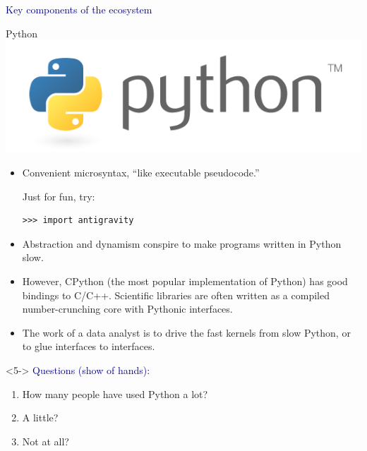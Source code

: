 \documentclass[aspectratio=169]{beamer}
\begin{document}
\begin{frame}{}
\begin{center}
\LARGE \textcolor{darkblue}{Key components of the ecosystem}
\end{center}
\end{frame}

\begin{frame}[fragile]{Python}
\vspace{0.5 cm}
\hfill \includegraphics[height=1 cm]{python-logo.png}

\vspace{-1 cm}
\begin{itemize}\setlength{\itemsep}{0.25 cm}
\item Convenient microsyntax, ``like executable pseudocode.''

Just for fun, try:

\small
\begin{verbatim}
>>> import antigravity
\end{verbatim}
\normalsize

\item<2-> Abstraction and dynamism conspire to make programs written in Python slow.

\item<3-> However, CPython (the most popular implementation of Python) has good bindings to C/C++. Scientific libraries are often written as a compiled number-crunching core with Pythonic interfaces.

\item<4-> The work of a data analyst is to drive the fast kernels from slow Python, or to glue interfaces to interfaces.
\end{itemize}

\vspace{0.25 cm}
\begin{uncoverenv}<5->
\small
\textcolor{darkblue}{Questions (show of hands):}
\vspace{-0.2 cm}
\begin{enumerate}\setlength{\itemsep}{-0.1 cm}
\item How many people have used Python a lot?
\item A little?
\item Not at all?
\end{enumerate}
\end{uncoverenv}
\end{frame}
\end{document}
